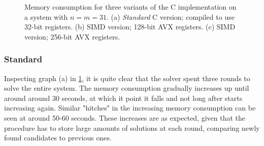 \begin{figure}[t]
    \centering
    \caption{Memory consumption for three variants of the C implementation on a system with $n = m = 31$. (a) \textit{Standard} C version; compiled to use 32-bit registers. (b) SIMD version; 128-bit AVX registers. (c) SIMD version; 256-bit AVX registers.} \label{fig:mem_dinur}
\end{figure}

\subsubsection{Standard}

Inspecting graph (a) in \cref{fig:mem_dinur}, it is quite clear that the solver spent three rounds to solve the entire system. The memory consumption gradually increases up until around around 30 seconds, at which it point it falls and not long after starts increasing again. Similar "hitches" in the increasing memory consumption can be seen at around 50-60 seconds. These increases are as expected, given that the procedure has to store large amounts of solutions at each round, comparing newly found candidates to previous ones.

